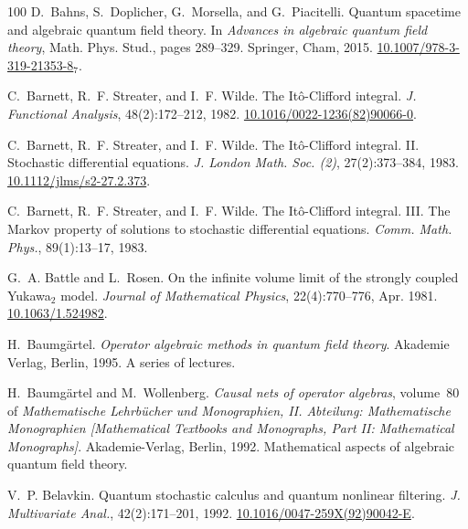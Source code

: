 \documentclass[11pt]{article}
\newcommand{\tmrsub}[1]{\ensuremath{_{\textrm{#1}}}}
\newcommand{\tmtextit}[1]{{\itshape{#1}}}
\begin{document}
\begin{thebibliography}{100}
  D.~Bahns, S.~Doplicher, G.~Morsella, and
  G.~Piacitelli. {\newblock}Quantum spacetime and algebraic quantum field
  theory. {\newblock}In \tmtextit{Advances in algebraic quantum field theory},
  Math. Phys. Stud., pages 289--329. Springer, Cham, 2015. {\newblock}
  \href{https://doi.org/10.1007/978-3-319-21353-8_7}{10.1007/978-3-319-21353-8\tmrsub{7}}.
  
  C.~Barnett, R.~F. Streater, and I.~F. Wilde.
  {\newblock}The It{\^o}-Clifford integral. {\newblock}\tmtextit{J. Functional
  Analysis}, 48(2):172--212, 1982. {\newblock}
  \href{https://doi.org/10.1016/0022-1236(82)90066-0}{10.1016/0022-1236(82)90066-0}.
  
  C.~Barnett, R.~F. Streater, and I.~F. Wilde.
  {\newblock}The It{\^o}-Clifford integral. II. Stochastic differential
  equations. {\newblock}\tmtextit{J. London Math. Soc. (2)}, 27(2):373--384,
  1983. {\newblock}
  \href{https://doi.org/10.1112/jlms/s2-27.2.373}{10.1112/jlms/s2-27.2.373}.
  
  C.~Barnett, R.~F. Streater, and I.~F. Wilde.
  {\newblock}The It{\^o}-Clifford integral. III. The Markov property of
  solutions to stochastic differential equations. {\newblock}\tmtextit{Comm.
  Math. Phys.}, 89(1):13--17, 1983.
  
  G.~A. Battle and L.~Rosen. {\newblock}On
  the infinite volume limit of the strongly coupled Yukawa\tmrsub{$2$} model.
  {\newblock}\tmtextit{Journal of Mathematical Physics}, 22(4):770--776, Apr.
  1981. {\newblock}\href{https://doi.org/10.1063/1.524982}{10.1063/1.524982}.
  
  H.~Baumg{\"a}rtel. {\newblock}\tmtextit{Operator
  algebraic methods in quantum field theory}. {\newblock}Akademie Verlag,
  Berlin, 1995. {\newblock}A series of lectures.
  
  H.~Baumg{\"a}rtel and M.~Wollenberg.
  {\newblock}\tmtextit{Causal nets of operator algebras}, volume~80 of
  \tmtextit{Mathematische Lehrb{\"u}cher und Monographien, II. Abteilung:
  Mathematische Monographien [Mathematical Textbooks and Monographs, Part II:
  Mathematical Monographs]}. {\newblock}Akademie-Verlag, Berlin, 1992.
  {\newblock}Mathematical aspects of algebraic quantum field theory.
  
  V.~P. Belavkin. {\newblock}Quantum stochastic calculus
  and quantum nonlinear filtering. {\newblock}\tmtextit{J. Multivariate
  Anal.}, 42(2):171--201, 1992. {\newblock}
  \href{https://doi.org/10.1016/0047-259X(92)90042-E}{10.1016/0047-259X(92)90042-E}.
  

\end{thebibliography}
\end{document}
